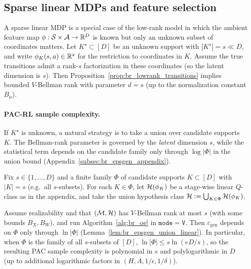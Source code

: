 \subsection{Sparse linear MDPs and feature selection}
\label{subsec:br_zoo_sparse}

A sparse linear MDP is a special case of the low-rank model in which the ambient feature map
$\phi:\mathcal{S}\times\mathcal{A}\to\mathbb{R}^D$ is known but only an unknown subset of coordinates matters.
Let $K^\star\subset[D]$ be an unknown support with $|K^\star|=s\ll D$, and write $\phi_K(s,a)\in\mathbb{R}^s$
for the restriction to coordinates in $K$.
Assume the true transitions admit a rank-$s$ factorization in these coordinates (so the latent
dimension is $s$).  Then Proposition~\ref{prop:br_lowrank_transitions} implies bounded $V$-Bellman rank
with parameter $d=s$ (up to the normalization constant $B_\mu$).

\paragraph{PAC-RL sample complexity.}
If $K^\star$ is unknown, a natural strategy is to take a union over candidate supports $K$.
The Bellman-rank parameter is governed by the \emph{latent} dimension $s$, while the statistical term
depends on the candidate family only through $\log|\Phi|$ in the union bound
(Appendix~\ref{subsec:br_epsgen_appendix}).

\begin{corollary}
\label{cor:br_feature_select_inst}
Fix $s\in\{1,\dots,D\}$ and a finite family $\Phi$ of candidate supports $K\subset[D]$ with $|K|=s$
(e.g.\ all $s$-subsets).
For each $K\in\Phi$, let $\mathcal{H}(\phi_K)$ be a stage-wise linear $Q$-class as in the appendix, and take
the union hypothesis class $\mathcal{H}:=\bigcup_{K\in\Phi}\mathcal{H}(\phi_K)$.

Assume realizability and that $(\mathcal{M},\mathcal{H})$ has $V$-Bellman rank at most $s$ (with some bounds
$B_X,B_W$), and run Algorithm~\ref{alg:br_oe} in $\mathtt{mode}=\mathtt{V}$.
Then $\varepsilon_{\mathrm{gen}}$ depends on $\Phi$ only through $\ln|\Phi|$ (Lemma~\ref{lem:br_epsgen_union_linear}).
In particular, when $\Phi$ is the family of all $s$-subsets of $[D]$, $\ln|\Phi|\le s\ln(eD/s)$, so the
resulting PAC sample complexity is polynomial in $s$ and polylogarithmic in $D$ (up to additional
logarithmic factors in $(H,A,1/\epsilon,1/\delta)$).
\end{corollary}

